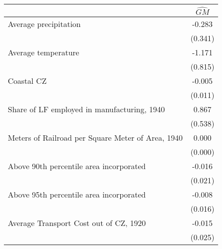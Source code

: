  \begin{tabular}{l*{1}{c}} \toprule
                &\multicolumn{1}{c}{$\widehat{GM}$}\\
\midrule
Average precipitation&   -0.283   \\
                &  (0.341)   \\
\addlinespace
Average temperature&   -1.171   \\
                &  (0.815)   \\
\addlinespace
Coastal CZ      &   -0.005   \\
                &  (0.011)   \\
\addlinespace
Share of LF employed in manufacturing, 1940&    0.867   \\
                &  (0.538)   \\
\addlinespace
Meters of Railroad per Square Meter of Area, 1940&    0.000   \\
                &  (0.000)   \\
\addlinespace
Above 90th percentile area incorporated&   -0.016   \\
                &  (0.021)   \\
\addlinespace
Above 95th percentile area incorporated&   -0.008   \\
                &  (0.016)   \\
\addlinespace
Average Transport Cost out of CZ, 1920&   -0.015   \\
                &  (0.025)   \\
 \bottomrule \end{tabular}
